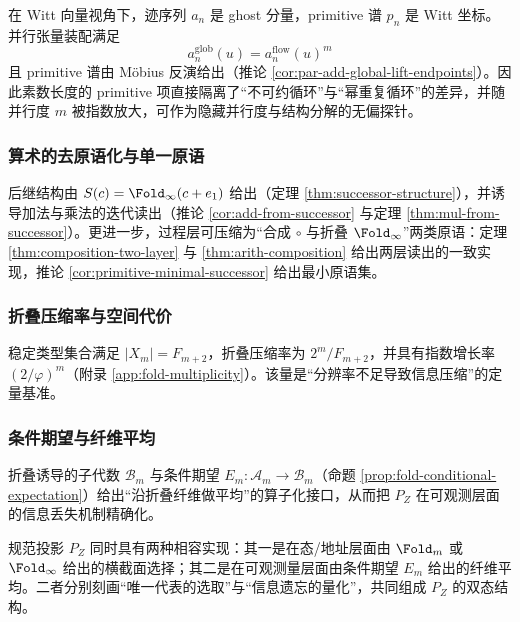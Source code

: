 \begin{remark}\label{rem:pom-witt-amplifier}
在 Witt 向量视角下，迹序列 $a_n$ 是 ghost 分量，primitive 谱 $p_n$ 是 Witt 坐标。并行张量装配满足
\[
a_n^{\mathrm{glob}}(u)=a_n^{\mathrm{flow}}(u)^m
\]
且 primitive 谱由 Möbius 反演给出（推论 \ref{cor:par-add-global-lift-endpoints}）。因此素数长度的 primitive 项直接隔离了“不可约循环”与“幂重复循环”的差异，并随并行度 $m$ 被指数放大，可作为隐藏并行度与结构分解的无偏探针。
\end{remark}

\subsubsection{算术的去原语化与单一原语}\label{subsec:pom-primitive-free}
后继结构由 $S(c)=\Fold_\infty(c+e_1)$ 给出（定理 \ref{thm:successor-structure}），并诱导加法与乘法的迭代读出（推论 \ref{cor:add-from-successor} 与定理 \ref{thm:mul-from-successor}）。更进一步，过程层可压缩为“合成 $\circ$ 与折叠 $\Fold_\infty$”两类原语：定理 \ref{thm:composition-two-layer} 与 \ref{thm:arith-composition} 给出两层读出的一致实现，推论 \ref{cor:primitive-minimal-successor} 给出最小原语集。

\subsubsection{折叠压缩率与空间代价}\label{subsec:pom-fold-compression}
稳定类型集合满足 $|X_m|=F_{m+2}$，折叠压缩率为 $2^m/F_{m+2}$，并具有指数增长率 $(2/\varphi)^m$（附录 \ref{app:fold-multiplicity}）。该量是“分辨率不足导致信息压缩”的定量基准。

\subsubsection{条件期望与纤维平均}\label{subsec:pom-conditional-expectation}
折叠诱导的子代数 $\mathcal{B}_m$ 与条件期望 $E_m:\mathcal{A}_m\to\mathcal{B}_m$（命题 \ref{prop:fold-conditional-expectation}）给出“沿折叠纤维做平均”的算子化接口，从而把 $P_Z$ 在可观测层面的信息丢失机制精确化。

\begin{remark}[规范投影的双态]\label{rem:pom-pz-dual}
规范投影 $P_Z$ 同时具有两种相容实现：其一是在态/地址层面由 $\Fold_m$ 或 $\Fold_\infty$ 给出的横截面选择；其二是在可观测量层面由条件期望 $E_m$ 给出的纤维平均。二者分别刻画“唯一代表的选取”与“信息遗忘的量化”，共同组成 $P_Z$ 的双态结构。
\end{remark}

